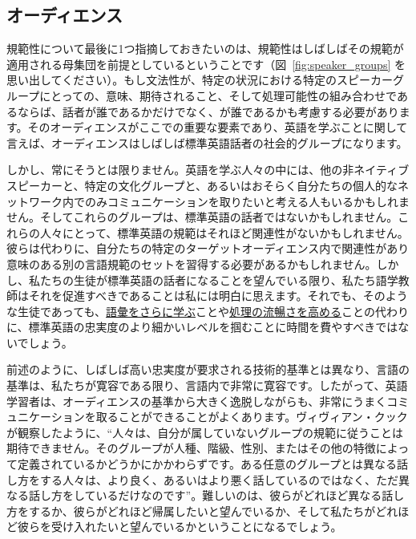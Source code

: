 \subsection{オーディエンス}

規範性について最後に1つ指摘しておきたいのは、規範性はしばしばその規範が適用される母集団を前提としているということです（図~\ref{fig:speaker_groups} を思い出してください）。もし文法性が、特定の状況における特定のスピーカーグループにとっての、意味、期待されること、そして処理可能性の組み合わせであるならば、話者が誰であるかだけでなく、が誰であるかも考慮する必要があります。そのオーディエンスがここでの重要な要素であり、英語を学ぶことに関して言えば、オーディエンスはしばしば標準英語話者の社会的グループになります。

しかし、常にそうとは限りません。英語を学ぶ人々の中には、他の非ネイティブスピーカーと、特定の文化グループと、あるいはおそらく自分たちの個人的なネットワーク内でのみコミュニケーションを取りたいと考える人もいるかもしれません。そしてこれらのグループは、標準英語の話者ではないかもしれません。これらの人々にとって、標準英語の規範はそれほど関連性がないかもしれません。彼らは代わりに、自分たちの特定のターゲットオーディエンス内で関連性があり意味のある別の言語規範のセットを習得する必要があるかもしれません。しかし、私たちの生徒が標準英語の話者になることを望んでいる限り、私たち語学教師はそれを促進すべきであることは私には明白に思えます。それでも、そのような生徒であっても、\hyperref[ch:vocabulary]{語彙をさらに学ぶ}ことや\hyperref[ch:fluency]{処理の流暢さを高める}ことの代わりに、標準英語の忠実度のより細かいレベルを掴むことに時間を費やすべきではないでしょう。

前述のように、しばしば高い忠実度が要求される技術的基準とは異なり、言語の基準は、私たちが寛容である限り、言語内で非常に寛容です。したがって、英語学習者は、オーディエンスの基準から大きく逸脱しながらも、非常にうまくコミュニケーションを取ることができることがよくあります。ヴィヴィアン・クックが観察したように、\enquote{人々は、自分が属していないグループの規範に従うことは期待できません。そのグループが人種、階級、性別、またはその他の特徴によって定義されているかどうかにかかわらずです。ある任意のグループとは異なる話し方をする人々は、より良く、あるいはより悪く話しているのではなく、ただ異なる話し方をしているだけなのです}\citep[194]{Cook1999}。難しいのは、彼らがどれほど異なる話し方をするか、彼らがどれほど帰属したいと望んでいるか、そして私たちがどれほど彼らを受け入れたいと望んでいるかということになるでしょう。

